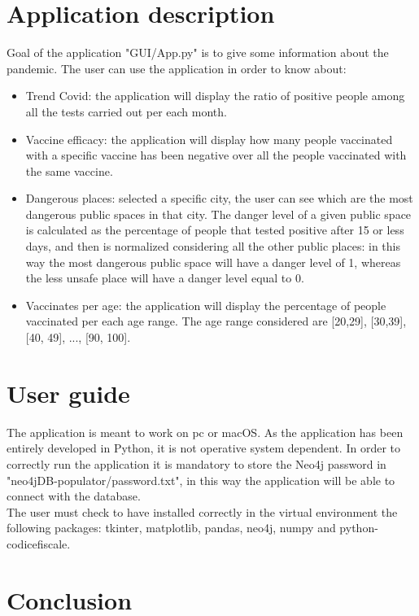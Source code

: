 \documentclass{article}
\begin{document}
\section{Application description}
Goal of the application {\selectfont"GUI/App.py"} is to give some information about the pandemic.
The user can use the application in order to know about:
\begin{itemize}
    \item Trend Covid: the application will display the ratio of positive people among all the tests carried out per each month.
    \item Vaccine efficacy: the application will display how many people vaccinated with a specific vaccine has been negative over all
    the people vaccinated with the same vaccine.
    \item Dangerous places: selected a specific city, the user can see which are the most dangerous public spaces in that city. The danger level of
    a given public space is calculated as the percentage of people that tested positive after 15 or less days, and then is normalized considering
    all the other public places: in this way the most dangerous public space will have a danger level of 1,
    whereas the less unsafe place will have a danger level equal to 0.
    \item Vaccinates per age: the application will display the percentage of people vaccinated per each age range.
    The age range considered are [20,29], [30,39], [40, 49], ..., [90, 100].
\end{itemize}

\section{User guide}
The application is meant to work on pc or macOS. As the application has been entirely developed in Python, it is not
operative system dependent.
In order to correctly run the application it is mandatory to store the Neo4j password in {\selectfont"neo4jDB-populator/password.txt"},
in this way the application will be able to connect with the database.
\\The user must check to have installed correctly in the virtual environment the following packages: {\selectfont tkinter,
matplotlib, pandas, neo4j, numpy and python-codicefiscale}.

\newpage

\section{Conclusion}
\end{document}
